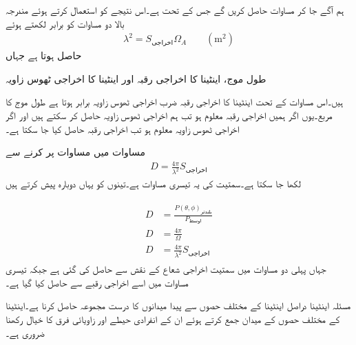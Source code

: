 ہم آگے جا کر مساوات  حاصل کریں گے جس کے تحت   ہے۔اس نتیجے کو استعمال کرتے ہوئے مندرجہ بالا دو مساوات کو برابر لکھتے ہوئے
\begin{align}\label{مساوات_اینٹینا_اخراجی_ٹھوس_زاویہ_اخراجی_رقبہ_تعلق}
\lambda^2 =S_{\text{اخراجی}} \Omega_A \quad \quad (\si{\meter \squared})
\end{align}
حاصل ہوتا ہے جہاں
\begin{description}
 طول موج،
  اینٹینا کا اخراجی رقبہ اور
 اینٹینا کا اخراجی ٹھوس زاویہ
\end{description}
ہیں۔اس مساوات کے تحت اینٹینا کا اخراجی رقبہ ضرب اخراجی ٹھوس زاویہ برابر ہوتا ہے  طول موج کا مربع۔یوں اگر ہمیں اخراجی رقبہ معلوم ہو تب ہم اخراجی ٹھوس زاویہ حاصل کر سکتے ہیں اور اگر اخراجی ٹھوس زاویہ معلوم ہو تب اخراجی رقبہ حاصل کیا جا سکتا ہے۔

مساوات  میں مساوات  پر کرنے سے
\begin{align}
D=\frac{4\pi}{\lambda^2} S_{\text{اخراجی}}
\end{align}
لکھا جا سکتا ہے۔سمتیت کی یہ تیسری مساوات ہے۔تینوں کو یہاں دوبارہ پیش کرتے ہیں

\begin{gather}
\begin{aligned}\label{مساوات_اینٹینا_سمتیت_مختلف_تعارف}
D&=\frac{P(\theta,\phi)_{\text{بلندتر}}}{P_{\text{اوسط}}} \\
D&=\frac{4\pi}{\Omega} \\
D&=\frac{4\pi}{\lambda^2} S_{\text{اخراجی}}
\end{aligned}
\end{gather}
جہاں پہلی دو مساوات میں سمتیت اخراجی شعاع کے نقش سے حاصل کی گئی ہے جبکہ تیسری مساوات میں اسے اخراجی رقبے سے حاصل کیا گیا ہے۔

مسئلہ اینٹینا دراصل اینٹینا کے مختلف حصوں سے پیدا میدانوں کا درست مجموعہ حاصل کرنا ہے۔اینٹینا کے مختلف حصوں کے میدان جمع کرتے ہوئے ان کے انفرادی حیطے اور زاویائی فرق کا خیال رکھنا ضروری ہے۔

